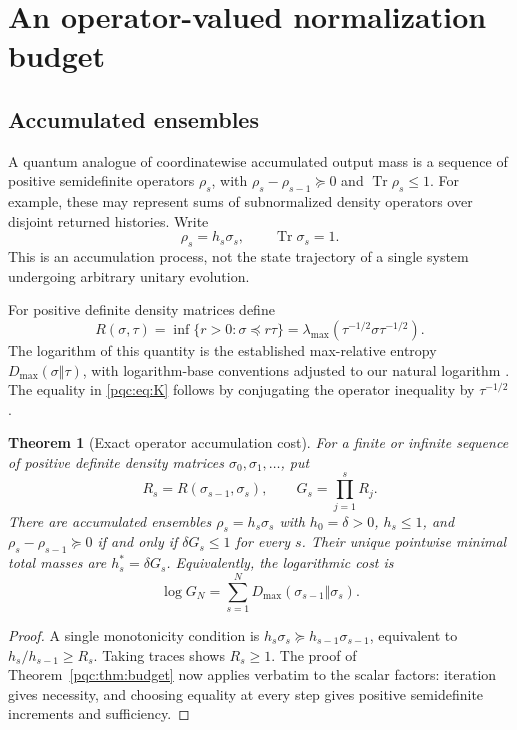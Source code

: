 \documentclass[11pt,letterpaper]{article}
\numberwithin{equation}{section}
\newtheorem{theorem}{Theorem}[section]
\theoremstyle{definition}
\theoremstyle{remark}
\newcommand{\Tr}{\operatorname{Tr}}
\newcommand{\Dmax}{D_{\max}}
\begin{document}
\section{An operator-valued normalization budget}\label{pqc:sec:operator}

\subsection{Accumulated ensembles}
A quantum analogue of coordinatewise accumulated output mass is a sequence
of positive semidefinite operators $\rho_s$, with
$\rho_s-\rho_{s-1}\succeq0$ and $\Tr\rho_s\le1$. For example, these may
represent sums of subnormalized density operators over disjoint returned
histories. Write
\[
 \rho_s=h_s\sigma_s,\qquad \Tr\sigma_s=1.
\]
This is an accumulation process, not the state trajectory of a single
system undergoing arbitrary unitary evolution.

For positive definite density matrices define
\begin{equation}\label{pqc:eq:K}
 R(\sigma,\tau)=\inf\{r>0:\sigma\preceq r\tau\}
 =\lambda_{\max}(\tau^{-1/2}\sigma\tau^{-1/2}).
\end{equation}
The logarithm of this quantity is the established max-relative entropy
$\Dmax(\sigma\Vert\tau)$, with logarithm-base conventions adjusted to our
natural logarithm \cite{datta}. The equality in \eqref{pqc:eq:K} follows by
conjugating the operator inequality by $\tau^{-1/2}$.

\begin{theorem}[Exact operator accumulation cost]\label{pqc:thm:operator}
For a finite or infinite sequence of positive definite density matrices
$\sigma_0,\sigma_1,\ldots$, put
\[
 R_s=R(\sigma_{s-1},\sigma_s),\qquad G_s=\prod_{j=1}^s R_j.
\]
There are accumulated ensembles $\rho_s=h_s\sigma_s$ with
$h_0=\delta>0$, $h_s\le1$, and $\rho_s-\rho_{s-1}\succeq0$ if and only if
$\delta G_s\le1$ for every $s$. Their unique pointwise minimal total masses
are $h_s^*=\delta G_s$. Equivalently, the logarithmic cost is
\begin{equation}
 \log G_N=\sum_{s=1}^{N}\Dmax(\sigma_{s-1}\Vert\sigma_s).
\end{equation}
\end{theorem}
\begin{proof}
A single monotonicity condition is
$h_s\sigma_s\succeq h_{s-1}\sigma_{s-1}$, equivalent to
$h_s/h_{s-1}\ge R_s$. Taking traces shows $R_s\ge1$.
The proof of Theorem~\ref{pqc:thm:budget} now applies verbatim to the scalar
factors: iteration gives necessity, and choosing equality at every step
gives positive semidefinite increments and sufficiency.
\end{proof}
\end{document}
